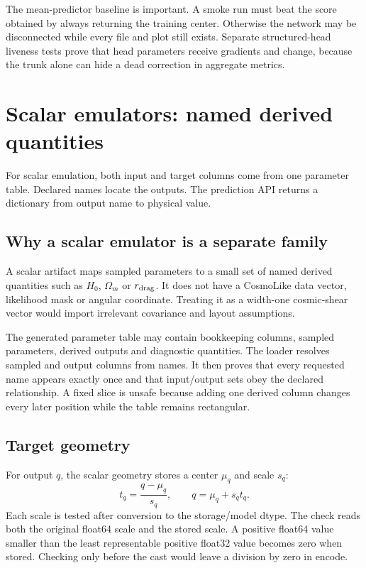 \documentclass[10pt,aps,prd,twocolumn,nofootinbib]{revtex4-2}
\begin{document}
The mean-predictor baseline is important.  A smoke run must beat the score
obtained by always returning the training center.  Otherwise the network may
be disconnected while every file and plot still exists.  Separate
structured-head liveness tests prove that head parameters receive gradients and change,
because the trunk alone can hide a dead correction in aggregate metrics.

\section{Scalar emulators: named derived quantities}
\label{sec:scalar}

For scalar emulation, both input and target columns come from one parameter
table.  Declared names locate the outputs.  The prediction API returns a
dictionary from output name to physical value.

\subsection{Why a scalar emulator is a separate family}

A scalar artifact maps sampled parameters to a small set of named derived
quantities such as \(H_0\), \(\Omega_m\) or \(r_{\rm drag}\).  It does not
have a CosmoLike data vector, likelihood mask or angular coordinate.  Treating
it as a width-one cosmic-shear vector would import irrelevant covariance and
layout assumptions.

The generated parameter table may contain bookkeeping columns, sampled
parameters, derived outputs and diagnostic quantities.  The loader resolves
sampled and output columns from names.  It then proves that every requested
name appears exactly once and that input/output sets obey the declared
relationship.  A fixed slice is unsafe because adding one derived column
changes every later position while the table remains rectangular.

\subsection{Target geometry}

For output \(q\), the scalar geometry stores a center \(\mu_q\) and scale
\(s_q\):
\begin{equation*}
 t_q=\frac{q-\mu_q}{s_q},\qquad
 q=\mu_q+s_qt_q.
\end{equation*}
Each scale is tested after conversion to the storage/model dtype.  The check
reads both the original float64 scale and the stored scale.  A positive
float64 value smaller than the least representable positive float32 value
becomes zero when stored.  Checking only before the cast would leave a division
by zero in encode.
\end{document}
